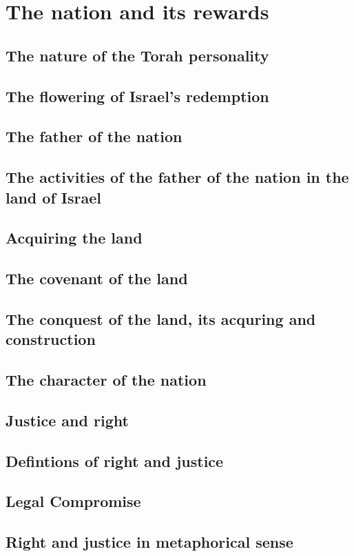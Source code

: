 \documentclass[11pt, a5paper, twoside, chapterprefix, openany]{scrbook}
\begin{document}
\part{The nation and its rewards}
\chapter{The nature of the Torah personality}
\chapter{The flowering of Israel’s redemption}
\chapter{The father of the nation}
\chapter{The activities of the father of the nation in the land of Israel}
\chapter{Acquiring the land}
\chapter{The covenant of the land}
\chapter{The conquest of the land, its acquring and construction}
\chapter{The character of the nation}
\chapter{Justice and right}
\chapter{Defintions of right and justice}
\chapter{Legal Compromise}
\chapter{Right and justice in metaphorical sense}
\end{document}
